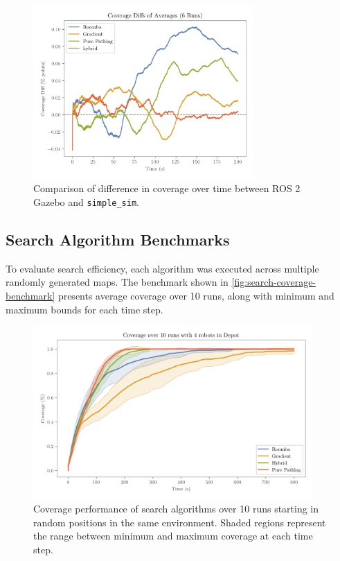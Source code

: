 \begin{figure}[H]
    \begin{center}
        \includegraphics[width=0.75\textwidth]{./figures/plots/consistency/coverage-diffs-of-averages-(6-runs).png}
    \end{center}
    \caption{Comparison of difference in coverage over time between ROS 2 Gazebo and \texttt{simple\_sim}.}
    \label{fig:coverage-benchmark-diff}
\end{figure}

\subsection{Search Algorithm Benchmarks}
To evaluate search efficiency, each algorithm was executed across multiple randomly generated maps. The benchmark shown in \cref{fig:search-coverage-benchmark} presents average coverage over 10 runs, along with minimum and maximum bounds for each time step.

\begin{figure}[H]
    \begin{center}
        \includegraphics[width=0.95\textwidth]{./figures/plots/benchmarks/coverage-over-10-runs-with-4-robots-in-depot.png}
    \end{center}
    \caption{Coverage performance of search algorithms over 10 runs starting in random positions in the same environment. Shaded regions represent the range between minimum and maximum coverage at each time step.}
    \label{fig:coverage-benchmark}
\end{figure}

